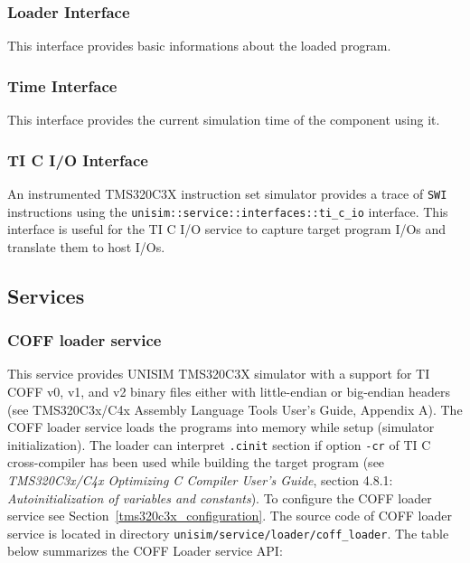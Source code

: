 \begin{center}
	
\end{center}

\subsubsection{Loader Interface}

This interface provides basic informations about the loaded program.

\begin{center}
	
\end{center}

\subsubsection{Time Interface}

This interface provides the current simulation time of the component using it.


\begin{center}
	
\end{center}

\subsubsection{TI C I/O Interface}

An instrumented TMS320C3X instruction set simulator provides a trace of \texttt{SWI} instructions using the \texttt{unisim::service::interfaces::ti\_c\_io} interface.
This interface is useful for the TI C I/O service to capture target program I/Os and translate them to host I/Os.

\begin{center}
	
\end{center}

\newpage
\subsection{Services}
\subsubsection{COFF loader service}
\label{tms320c3x_coff_loader}

This service provides UNISIM TMS320C3X simulator with a support for TI COFF v0, v1, and v2 binary files  either with little-endian or big-endian headers (see TMS320C3x/C4x Assembly Language Tools User’s Guide, Appendix A). 
The COFF loader service loads the programs into memory while setup (simulator initialization).
The loader can interpret \texttt{.cinit} section if option \texttt{-cr} of TI C cross-compiler has been used while building the target program (see \textit{TMS320C3x/C4x Optimizing C Compiler User’s Guide}, section 4.8.1: \textit{Autoinitialization of variables and constants}).
To configure the COFF loader service see Section~\ref{tms320c3x_configuration}.
The source code of COFF loader service is located in directory \texttt{unisim/service/loader/coff\_loader}.
\noindent The table below summarizes the COFF Loader service API:

